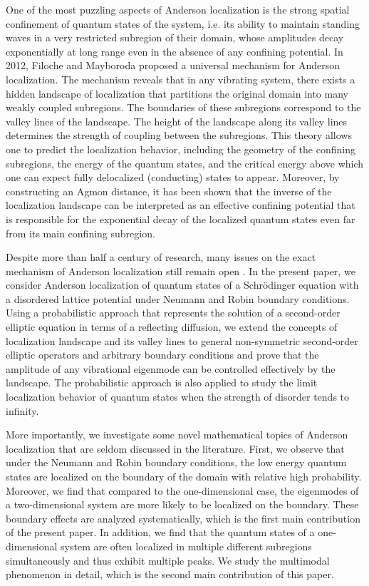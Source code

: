 \documentclass[a4paper,11pt]{article}
\begin{document}
One of the most puzzling aspects of Anderson localization is the strong spatial confinement of quantum states of the system, i.e. its ability to maintain standing waves in a very restricted subregion of their domain, whose amplitudes decay exponentially at long range even in the absence of any confining potential. In 2012, Filoche and Mayboroda \cite{filoche2012universal} proposed a universal mechanism for Anderson localization. The mechanism reveals that in any vibrating system, there exists a hidden landscape of localization that partitions the original domain into many weakly coupled subregions. The boundaries of these subregions correspond to the valley lines of the landscape. The height of the landscape along its valley lines determines the strength of coupling between the subregions. This theory allows one to predict the localization behavior, including the geometry of the confining subregions, the energy of the quantum states, and the critical energy above which one can expect fully delocalized (conducting) states to appear. Moreover, by constructing an Agmon distance, it has been shown \cite{arnold2016effective, arnold2019localization, arnold2019computing} that the inverse of the localization landscape can be interpreted as an effective confining potential that is responsible for the exponential decay of the localized quantum states even far from its main confining subregion.

Despite more than half a century of research, many issues on the exact mechanism of Anderson localization still remain open \cite{abrahams2001metallic, evers2008anderson, lagendijk2009fifty}. In the present paper, we consider Anderson localization of quantum states of a Schr\"{o}dinger equation with a disordered lattice potential under Neumann and Robin boundary conditions. Using a probabilistic approach that represents the solution of a second-order elliptic equation in terms of a reflecting diffusion, we extend the concepts of localization landscape and its valley lines to general non-symmetric second-order elliptic operators and arbitrary boundary conditions and prove that the amplitude of any vibrational eigenmode can be controlled effectively by the landscape. The probabilistic approach is also applied to study the limit localization behavior of quantum states when the strength of disorder tends to infinity.

More importantly, we investigate some novel mathematical topics of Anderson localization that are seldom discussed in the literature. First, we observe that under the Neumann and Robin boundary conditions, the low energy quantum states are localized on the boundary of the domain with relative high probability. Moreover, we find that compared to the one-dimensional case, the eigenmodes of a two-dimensional system are more likely to be localized on the boundary. These boundary effects are analyzed systematically, which is the first main contribution of the present paper. In addition, we find that the quantum states of a one-dimensional system are often localized in multiple different subregions simultaneously and thus exhibit multiple peaks. We study the multimodal phenomenon in detail, which is the second main contribution of this paper.
\end{document}

